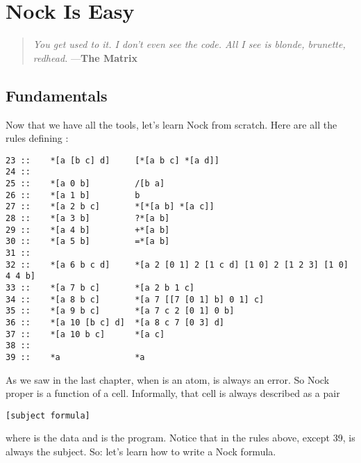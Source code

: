 \chapter{Nock Is Easy}

\begin{quote}
\noindent \emph{You get used to it. I don't even see the code.
All I see is blonde, brunette, redhead.}
\medskip \newline
---\textbf{The Matrix}
\end{quote}

\section{Fundamentals}

Now that we have all the tools, let's learn Nock from scratch.
Here are all the rules defining \kode{*}:

\begin{framed_shaded}
\begin{Verbatim}[fontsize=\relsize{-2.5},fontseries=b,commandchars=\\\{\}]
23 ::    *[a [b c] d]     [*[a b c] *[a d]]
24 ::
25 ::    *[a 0 b]         /[b a]
26 ::    *[a 1 b]         b
27 ::    *[a 2 b c]       *[*[a b] *[a c]]
28 ::    *[a 3 b]         ?*[a b]
29 ::    *[a 4 b]         +*[a b]
30 ::    *[a 5 b]         =*[a b]
31 ::
32 ::    *[a 6 b c d]     *[a 2 [0 1] 2 [1 c d] [1 0] 2 [1 2 3] [1 0] 4 4 b]
33 ::    *[a 7 b c]       *[a 2 b 1 c]
34 ::    *[a 8 b c]       *[a 7 [[7 [0 1] b] 0 1] c]
35 ::    *[a 9 b c]       *[a 7 c 2 [0 1] 0 b]
36 ::    *[a 10 [b c] d]  *[a 8 c 7 [0 3] d]
37 ::    *[a 10 b c]      *[a c]
38 ::
39 ::    *a               *a
\end{Verbatim}
\end{framed_shaded}

As we saw in the last chapter, when  is an atom,  is
always an error.  So Nock proper is a function of a cell.
Informally, that cell is always described as a pair

\begin{framed_shaded}
\begin{Verbatim}[fontsize=\relsize{-2.5},fontseries=b,commandchars=\\\{\}]
[subject formula]
\end{Verbatim}
\end{framed_shaded}

where  is the data and  is the program.  Notice
that  in the rules above, except 39, is always the subject.
So: let's learn how to write a Nock formula.

